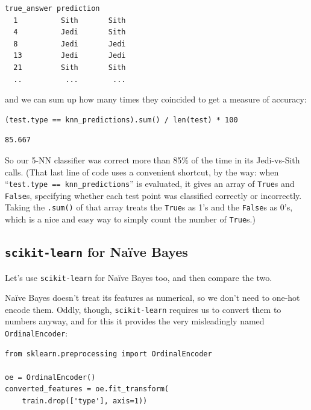 \begin{Verbatim}[fontsize=\normalsize,samepage=true,frame=leftline,framesep=5mm,framerule=1mm]
      true_answer prediction
  1          Sith       Sith
  4          Jedi       Sith
  8          Jedi       Jedi
  13         Jedi       Jedi
  21         Sith       Sith
  ..          ...        ...
\end{Verbatim}

and we can sum up how many times they coincided to get a measure of accuracy:

\begin{Verbatim}[fontsize=\small,samepage=true,frame=single,framesep=3mm]
(test.type == knn_predictions).sum() / len(test) * 100
\end{Verbatim}
\vspace{-.3in}

\begin{Verbatim}[fontsize=\small,samepage=true,frame=leftline,framesep=5mm,framerule=1mm]
85.667
\end{Verbatim}

So our 5-NN classifier was correct more than 85\% of the time in its
Jedi-vs-Sith calls. (That last line of code uses a convenient shortcut, by the
way: when ``\texttt{test.type == knn\_predictions}'' is evaluated, it gives an
array of \texttt{True}s and \texttt{False}s, specifying whether each test point
was classified correctly or incorrectly. Taking the \texttt{.sum()} of that
array treats the \texttt{True}s as 1's and the \texttt{False}s as 0's, which is
a nice and easy way to simply count the number of \texttt{True}s.)

\bigskip

\subsection{\texttt{scikit-learn} for Na\"{i}ve Bayes}

Let's use \texttt{scikit-learn} for Na\"{i}ve Bayes too, and then compare the
two.


Na\"{i}ve Bayes doesn't treat its features as numerical, so we don't need to
one-hot encode them. Oddly, though, \texttt{scikit-learn} requires us to
convert them to numbers anyway, and for this it provides the very misleadingly
named \texttt{OrdinalEncoder}:

\begin{Verbatim}[fontsize=\small,samepage=true,frame=single,framesep=3mm]
from sklearn.preprocessing import OrdinalEncoder

oe = OrdinalEncoder()
converted_features = oe.fit_transform(
    train.drop(['type'], axis=1))
\end{Verbatim}

